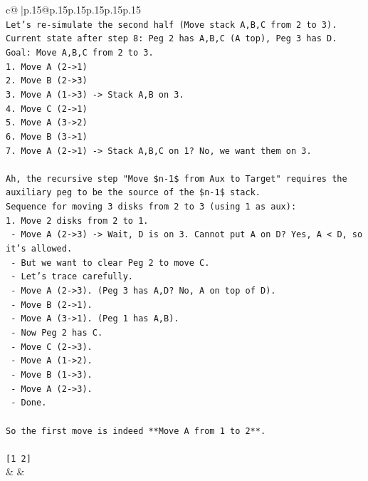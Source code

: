 \documentclass{article}
\begin{document}
{\begin{supertabular}{c@{$\;$}|p{.15\linewidth}@{}p{.15\linewidth}p{.15\linewidth}p{.15\linewidth}p{.15\linewidth}p{.15\linewidth}}
{{{\\ 
\texttt{Let's re{-}simulate the second half (Move stack A,B,C from 2 to 3).} \\
\texttt{Current state after step 8: Peg 2 has A,B,C (A top), Peg 3 has D.} \\
\texttt{Goal: Move A,B,C from 2 to 3.} \\
\texttt{1. Move A (2{-}>1)} \\
\texttt{2. Move B (2{-}>3)} \\
\texttt{3. Move A (1{-}>3) {-}> Stack A,B on 3.} \\
\texttt{4. Move C (2{-}>1)} \\
\texttt{5. Move A (3{-}>2)} \\
\texttt{6. Move B (3{-}>1)} \\
\texttt{7. Move A (2{-}>1) {-}> Stack A,B,C on 1? No, we want them on 3.} \\
\\ 
\texttt{Ah, the recursive step "Move \$n{-}1\$ from Aux to Target" requires the auxiliary peg to be the source of the \$n{-}1\$ stack.} \\
\texttt{Sequence for moving 3 disks from 2 to 3 (using 1 as aux):} \\
\texttt{1. Move 2 disks from 2 to 1.} \\
\texttt{   {-} Move A (2{-}>3) {-}> Wait, D is on 3. Cannot put A on D? Yes, A < D, so it's allowed.} \\
\texttt{   {-} But we want to clear Peg 2 to move C.} \\
\texttt{   {-} Let's trace carefully.} \\
\texttt{   {-} Move A (2{-}>3). (Peg 3 has A,D? No, A on top of D).} \\
\texttt{   {-} Move B (2{-}>1).} \\
\texttt{   {-} Move A (3{-}>1). (Peg 1 has A,B).} \\
\texttt{   {-} Now Peg 2 has C.} \\
\texttt{   {-} Move C (2{-}>3).} \\
\texttt{   {-} Move A (1{-}>2).} \\
\texttt{   {-} Move B (1{-}>3).} \\
\texttt{   {-} Move A (2{-}>3).} \\
\texttt{   {-} Done.} \\
\\ 
\texttt{So the first move is indeed **Move A from 1 to 2**.} \\
\\ 
\texttt{{[}1 2{]}} \\
            }
        }
    }
    & & \\ \\


\end{supertabular}}
\end{document}
